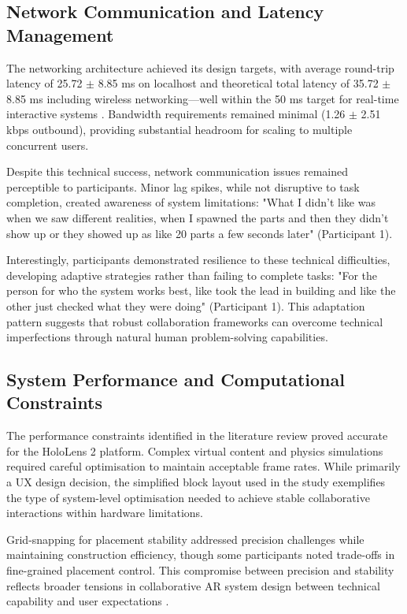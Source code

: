\subsection{Network Communication and Latency Management}
The networking architecture achieved its design targets, with average round-trip latency of 25.72 $\pm$ 8.85 ms on localhost and theoretical total latency of 35.72 $\pm$ 8.85 ms including wireless networking—well within the 50 ms target for real-time interactive systems \cite{sonkoly2024edge}. Bandwidth requirements remained minimal (1.26 $\pm$ 2.51 kbps outbound), providing substantial headroom for scaling to multiple concurrent users.

Despite this technical success, network communication issues remained perceptible to participants. Minor lag spikes, while not disruptive to task completion, created awareness of system limitations: "What I didn't like was when we saw different realities, when I spawned the parts and then they didn't show up or they showed up as like 20 parts a few seconds later" (Participant 1).

Interestingly, participants demonstrated resilience to these technical difficulties, developing adaptive strategies rather than failing to complete tasks: "For the person for who the system works best, like took the lead in building and like the other just checked what they were doing" (Participant 1). This adaptation pattern suggests that robust collaboration frameworks can overcome technical imperfections through natural human problem-solving capabilities.

\subsection{System Performance and Computational Constraints}
The performance constraints identified in the literature review \cite{reis2021caseStudy, schmidt2022augmentedReality} proved accurate for the HoloLens 2 platform. Complex virtual content and physics simulations required careful optimisation to maintain acceptable frame rates. While primarily a UX design decision, the simplified block layout used in the study exemplifies the type of system-level optimisation needed to achieve stable collaborative interactions within hardware limitations.

Grid-snapping for placement stability addressed precision challenges while maintaining construction efficiency, though some participants noted trade-offs in fine-grained placement control. This compromise between precision and stability reflects broader tensions in collaborative AR system design between technical capability and user expectations \cite{neumann1998cognitive}.

